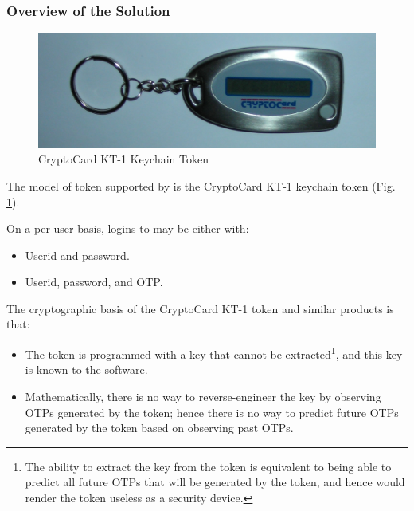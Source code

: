 \subsubsection{Overview of the Solution}
\label{ctbg0:sddc0:stfa0:sovs0}

%
\begin{figure}
\centering
\includegraphics[width=4.6in]{c_tbg0/cckt1_01.eps}
\caption{CryptoCard KT-1 Keychain Token}
\label{fig:ctbg0:sddc0:stfa0:sovs0:00}
\end{figure}

The model of token supported by \emph{\productbasename{}}
is the CryptoCard 
KT-1 keychain token 
(Fig. \ref{fig:ctbg0:sddc0:stfa0:sovs0:00}).


On a per-user basis, logins to \emph{\productbasename{}} may be either with:

\begin{itemize}
\item Userid and password.
\item Userid, password, and OTP. 
\end{itemize}

The cryptographic basis of the CryptoCard KT-1 token and similar products
is that:

\begin{itemize}
\item The token is programmed with a key that cannot be extracted\footnote{The
      ability to extract the key from the token is equivalent to being able
      to predict all future OTPs that will be generated by the token, and hence
      would render the token useless as a security device.}, and this key is known
      to the \emph{\productbasename{}} software.
\item Mathematically, there is no way to reverse-engineer the key by observing
      OTPs generated by the token; hence there is no way to predict future
      OTPs generated by the token based on observing past OTPs.
\end{itemize}

